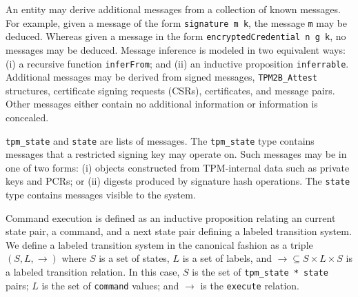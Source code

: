 \documentclass[runningheads]{llncs}
\begin{document}
An entity may derive additional messages from a collection of known
messages. For example, given a message of the form
\verb|signature m k|, the message \verb|m| may be deduced. Whereas
given a message in the form \verb|encryptedCredential n g k|, no
messages may be deduced. Message inference is modeled in two
equivalent ways: (i) a recursive function \verb|inferFrom|; and (ii)
an inductive proposition \verb|inferrable|.  Additional messages may
be derived from signed messages, \verb|TPM2B_Attest| structures,
certificate signing requests (CSRs), certificates, and message
pairs. Other messages either contain no additional information or
information is concealed.


\verb|tpm_state| and \verb|state| are lists of messages. The
\verb|tpm_state| type contains messages that a restricted signing key
may operate on. Such messages may be in one of two forms: (i) objects
constructed from TPM-internal data such as private keys and PCRs; or
(ii) digests produced by signature hash operations.  The \verb|state|
type contains messages visible to the system.

Command execution is defined as an inductive proposition relating an
current state pair, a command, and a next state pair defining a
labeled transition system. We define a labeled transition system in
the canonical fashion as a triple $(S,L,\rightarrow)$ where $S$ is a
set of states, $L$ is a set of labels, and
$\rightarrow \subseteq S \times L \times S$ is a labeled transition
relation. In this case, $S$ is the set of \verb|tpm_state * state|
pairs; $L$ is the set of \verb|command| values; and $\rightarrow$ is
the \verb|execute| relation.


\end{document}
